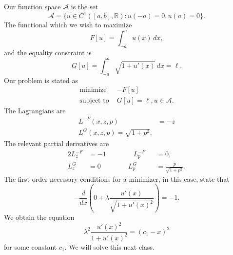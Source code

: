 \documentclass[11pt]{article}
\newcommand{\R}{\mathbb{R}}
\begin{document}
Our function space $\mathcal{A}$ is the set
\[
\mathcal{A} = \{ u \in C^1([a,b], \R) : u(-a) = 0, u(a) = 0 \}.
\]
The functional which we wish to maximize
\[
F[u] = \int_{-a}^a u(x) \, dx,
\]
and the equality constraint is
\[
G[u] = \int_{-a}^a \sqrt{1 + u'(x)} \, dx = \ell.
\]
Our problem is stated as
\begin{align*}
\text{minimize } &-F[u] \\
\text{subject to } & G[u] = \ell, u \in \mathcal{A}.
\end{align*}
The Lagrangians are
\begin{align*}
L^{-F}(x,z,p) &= -z \\
L^G(x,z,p) = \sqrt{1 + p^2}.
\end{align*}
The relevant partial derivatives are
\begin{alignat*}{2}
L^{-F}_z &= -1 \qquad\qquad L^{-F}_p &&= 0, \\
L^G_z &= 0 \qquad\qquad L^G_p &&= \frac{p}{\sqrt{1 + p^2}}.
\end{alignat*}
The first-order necessary conditions for a minimizer, in this case, state that
\[
-\frac{d}{dx} \left( 0 + \lambda \frac{u'(x)}{\sqrt{1 + u'(x)^2}} \right) = -1.
\]
We obtain the equation
\[
\lambda^2 \frac{u'(x)^2}{1 + u'(x)^2} = (c_1 - x)^2
\]
for some constant $c_1$. We will solve this next class.
\end{document}
